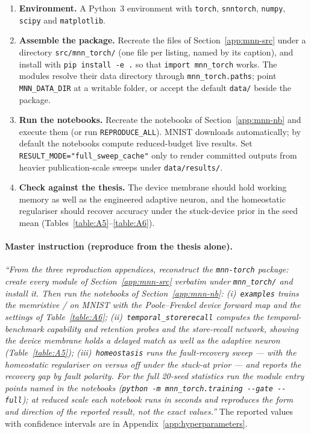 \begin{enumerate}
  \item \textbf{Environment.} A Python~3 environment with \texttt{torch}, \texttt{snntorch},
    \texttt{numpy}, \texttt{scipy} and \texttt{matplotlib}.
  \item \textbf{Assemble the package.} Recreate the files of
    Section~\ref{app:mnn-src} under a directory \texttt{src/mnn\_torch/} (one file per
    listing, named by its caption), and install with \texttt{pip install -e .} so that
    \texttt{import mnn\_torch} works. The modules resolve their data directory through
    \texttt{mnn\_torch.paths}; point \texttt{MNN\_DATA\_DIR} at a writable folder, or
    accept the default \texttt{data/} beside the package.
  \item \textbf{Run the notebooks.} Recreate the notebooks of Section~\ref{app:mnn-nb}
    and execute them (or run \texttt{REPRODUCE\_ALL}). MNIST downloads automatically; by
    default the notebooks compute reduced-budget live results. Set
    \texttt{RESULT\_MODE="full\_sweep\_cache"} only to render committed outputs from
    heavier publication-scale sweeps under \texttt{data/results/}.
  \item \textbf{Check against the thesis.} The device membrane should hold working memory
    as well as the engineered adaptive neuron, and the homeostatic regulariser should
    recover accuracy under the stuck-device prior in the seed mean
    (Tables~\ref{table:A5}--\ref{table:A6}).
\end{enumerate}

\paragraph{Master instruction (reproduce from the thesis alone).}
\emph{``From the three reproduction appendices, reconstruct the \texttt{mnn-torch} package:
create every module of Section~\ref{app:mnn-src} verbatim under \texttt{mnn\_torch/} and
install it. Then run the notebooks of Section~\ref{app:mnn-nb}: (i)~\texttt{examples} trains
the memristive / on MNIST with the Poole--Frenkel device forward
map and the settings of Table~\ref{table:A6}; (ii)~\texttt{temporal\_storerecall} computes the
temporal-benchmark capability and retention probes and the store-recall network, showing the
device membrane holds a delayed match as well as the adaptive neuron (Table~\ref{table:A5});
(iii)~\texttt{homeostasis} runs the fault-recovery sweep --- with the homeostatic regulariser
on versus off under the stuck-at prior --- and reports the recovery gap by fault polarity.
For the full 20-seed statistics run the module entry points named in the notebooks
(\texttt{python -m mnn\_torch.training -{}-gate -{}-full}); at reduced scale each notebook runs
in seconds and reproduces the form and direction of the reported result, not the exact
values.''} The reported values with confidence intervals are in
Appendix~\ref{app:hyperparameters}.

